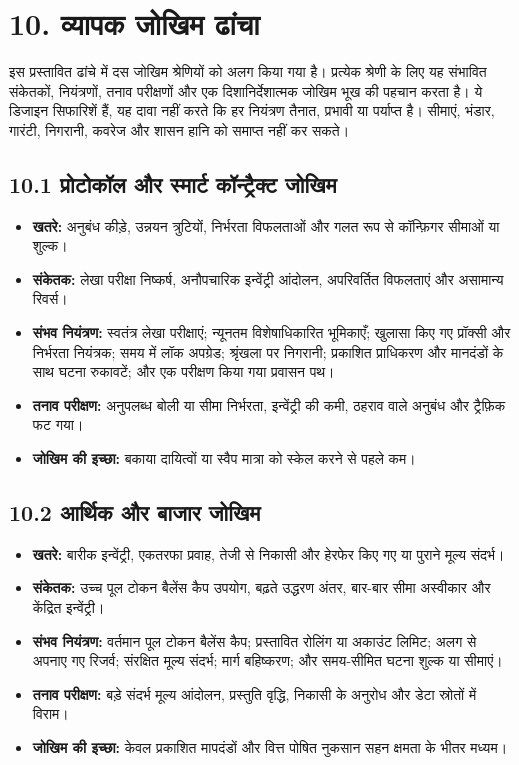 \documentclass[11pt]{article}
\begin{document}
\section*{10. व्यापक जोखिम ढांचा}

इस प्रस्तावित ढांचे में दस जोखिम श्रेणियों को अलग किया गया है। प्रत्येक श्रेणी के लिए यह संभावित संकेतकों, नियंत्रणों, तनाव परीक्षणों और एक दिशानिर्देशात्मक जोखिम भूख की पहचान करता है। ये डिजाइन सिफारिशें हैं, यह दावा नहीं करते कि हर नियंत्रण तैनात, प्रभावी या पर्याप्त है। सीमाएं, भंडार, गारंटी, निगरानी, कवरेज और शासन हानि को समाप्त नहीं कर सकते।

\subsection*{10.1 प्रोटोकॉल और स्मार्ट कॉन्ट्रैक्ट जोखिम}

\begin{itemize}[leftmargin=*]
\item \textbf{खतरे:} अनुबंध कीड़े, उन्नयन त्रुटियों, निर्भरता विफलताओं और गलत रूप से कॉन्फ़िगर सीमाओं या शुल्क।
\item \textbf{संकेतक:} लेखा परीक्षा निष्कर्ष, अनौपचारिक इन्वेंट्री आंदोलन, अपरिवर्तित विफलताएं और असामान्य रिवर्स।
\item \textbf{संभव नियंत्रण:} स्वतंत्र लेखा परीक्षाएं; न्यूनतम विशेषाधिकारित भूमिकाएँ; खुलासा किए गए प्रॉक्सी और निर्भरता नियंत्रक; समय में लॉक अपग्रेड; श्रृंखला पर निगरानी; प्रकाशित प्राधिकरण और मानदंडों के साथ घटना रुकावटें; और एक परीक्षण किया गया प्रवासन पथ।
\item \textbf{तनाव परीक्षण:} अनुपलब्ध बोली या सीमा निर्भरता, इन्वेंट्री की कमी, ठहराव वाले अनुबंध और ट्रैफ़िक फट गया।
\item \textbf{जोखिम की इच्छा:} बकाया दायित्वों या स्वैप मात्रा को स्केल करने से पहले कम।
\end{itemize}
\subsection*{10.2 आर्थिक और बाजार जोखिम}

\begin{itemize}[leftmargin=*]
\item \textbf{खतरे:} बारीक इन्वेंट्री, एकतरफा प्रवाह, तेजी से निकासी और हेरफेर किए गए या पुराने मूल्य संदर्भ।
\item \textbf{संकेतक:} उच्च पूल टोकन बैलेंस कैप उपयोग, बढ़ते उद्धरण अंतर, बार-बार सीमा अस्वीकार और केंद्रित इन्वेंट्री।
\item \textbf{संभव नियंत्रण:} वर्तमान पूल टोकन बैलेंस कैप; प्रस्तावित रोलिंग या अकाउंट लिमिट; अलग से अपनाए गए रिजर्व; संरक्षित मूल्य संदर्भ; मार्ग बहिष्करण; और समय-सीमित घटना शुल्क या सीमाएं।
\item \textbf{तनाव परीक्षण:} बड़े संदर्भ मूल्य आंदोलन, प्रस्तुति वृद्धि, निकासी के अनुरोध और डेटा स्रोतों में विराम।
\item \textbf{जोखिम की इच्छा:} केवल प्रकाशित मापदंडों और वित्त पोषित नुकसान सहन क्षमता के भीतर मध्यम।
\end{itemize}
\end{document}
